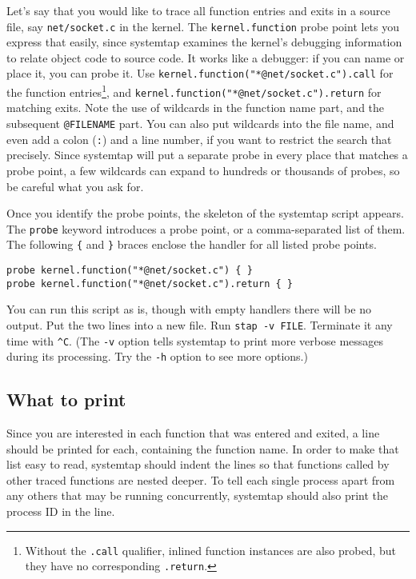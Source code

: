 \documentclass{article}
\renewcommand{\nomenclature}[2]{}
\begin{document}
Let's say that you would like to trace all function entries and exits
in a source file, say \verb+net/socket.c+ in the kernel.  The
\verb+kernel.function+ probe point lets you express that easily, since
systemtap examines the kernel's debugging information to relate object
code to source code.  It works like a debugger: if you can name or
place it, you can probe it.  Use
\verb+kernel.function("*@net/socket.c").call+ for the function
entries\footnote{Without the {\tt .call} qualifier, inlined function
instances are also probed, but they have no corresponding {\tt .return}.},
and \verb+kernel.function("*@net/socket.c").return+ for matching exits.  Note
the use of wildcards in the function name part, and the subsequent
\verb+@FILENAME+ part.  You can also put wildcards into the file name,
and even add a colon (\verb+:+) and a line number, if you want to
restrict the search that precisely.  Since systemtap will put a
separate probe in every place that matches a probe point, a few
wildcards can expand to hundreds or thousands of probes, so be careful
what you ask for.  \nomenclature{debug information}{Data created by the
compiler when the kernel or application was built, sometimes packaged into
{\tt debuginfo} files, for use by a symbolic debugger.}
\nomenclature{wildcard}{Presence of \verb+*+ globbing patterns in probe points.}

Once you identify the probe points, the skeleton of the systemtap
script appears.  The \verb+probe+ keyword introduces a probe point, or
a comma-separated list of them.  The following \verb+{+ and \verb+}+
braces enclose the handler for all listed probe points.
\begin{verbatim}
probe kernel.function("*@net/socket.c") { }
probe kernel.function("*@net/socket.c").return { }
\end{verbatim}
You can run this script as is, though with empty handlers there will
be no output.  Put the two lines into a new file.  Run
\verb+stap -v FILE+.  Terminate it any time with \verb+^C+.  (The
\verb+-v+ option tells systemtap to print more verbose messages during
its processing.  Try the \verb+-h+ option to see more options.)

\subsection{What to print}

Since you are interested in each function that was entered and exited,
a line should be printed for each, containing the function name.  In
order to make that list easy to read, systemtap should indent the
lines so that functions called by other traced functions are nested
deeper.  To tell each single process apart from any others that may be
running concurrently, systemtap should also print the process ID in
the line.
\end{document}
